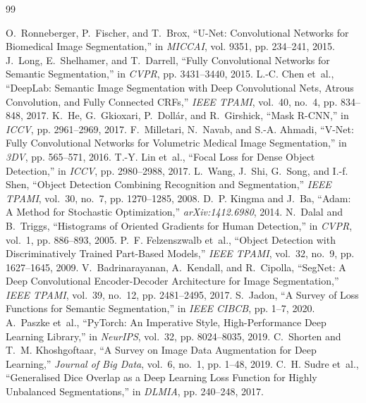 \documentclass[10pt,a4paper]{report}
\begin{document}

\begin{thebibliography}{99}
\setlength{\itemsep}{1pt}
\setlength{\parskip}{0pt}
 O.~Ronneberger, P.~Fischer, and T.~Brox, ``U-Net: Convolutional Networks for Biomedical Image Segmentation,'' in \emph{MICCAI}, vol. 9351, pp. 234--241, 2015.
 J.~Long, E.~Shelhamer, and T.~Darrell, ``Fully Convolutional Networks for Semantic Segmentation,'' in \emph{CVPR}, pp. 3431--3440, 2015.
 L.-C. Chen et~al., ``DeepLab: Semantic Image Segmentation with Deep Convolutional Nets, Atrous Convolution, and Fully Connected CRFs,'' \emph{IEEE TPAMI}, vol.~40, no.~4, pp. 834--848, 2017.
 K.~He, G.~Gkioxari, P.~Doll{\'a}r, and R.~Girshick, ``Mask R-CNN,'' in \emph{ICCV}, pp. 2961--2969, 2017.
 F.~Milletari, N.~Navab, and S.-A. Ahmadi, ``V-Net: Fully Convolutional Networks for Volumetric Medical Image Segmentation,'' in \emph{3DV}, pp. 565--571, 2016.
 T.-Y. Lin et~al., ``Focal Loss for Dense Object Detection,'' in \emph{ICCV}, pp. 2980--2988, 2017.
 L.~Wang, J.~Shi, G.~Song, and I.-f. Shen, ``Object Detection Combining Recognition and Segmentation,'' \emph{IEEE TPAMI}, vol.~30, no.~7, pp. 1270--1285, 2008.
 D.~P. Kingma and J.~Ba, ``Adam: A Method for Stochastic Optimization,'' \emph{arXiv:1412.6980}, 2014.
 N.~Dalal and B.~Triggs, ``Histograms of Oriented Gradients for Human Detection,'' in \emph{CVPR}, vol.~1, pp. 886--893, 2005.
 P.~F. Felzenszwalb et~al., ``Object Detection with Discriminatively Trained Part-Based Models,'' \emph{IEEE TPAMI}, vol.~32, no.~9, pp. 1627--1645, 2009.
 V.~Badrinarayanan, A.~Kendall, and R.~Cipolla, ``SegNet: A Deep Convolutional Encoder-Decoder Architecture for Image Segmentation,'' \emph{IEEE TPAMI}, vol.~39, no.~12, pp. 2481--2495, 2017.
 S.~Jadon, ``A Survey of Loss Functions for Semantic Segmentation,'' in \emph{IEEE CIBCB}, pp. 1--7, 2020.
 A.~Paszke et~al., ``PyTorch: An Imperative Style, High-Performance Deep Learning Library,'' in \emph{NeurIPS}, vol.~32, pp. 8024--8035, 2019.
 C.~Shorten and T.~M. Khoshgoftaar, ``A Survey on Image Data Augmentation for Deep Learning,'' \emph{Journal of Big Data}, vol.~6, no.~1, pp. 1--48, 2019.
 C.~H. Sudre et~al., ``Generalised Dice Overlap as a Deep Learning Loss Function for Highly Unbalanced Segmentations,'' in \emph{DLMIA}, pp. 240--248, 2017.
\end{thebibliography}
\end{document}
